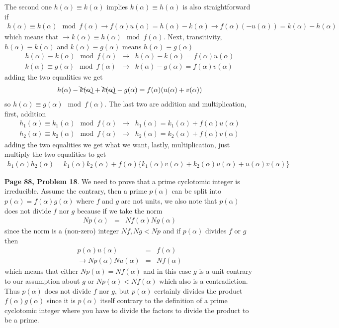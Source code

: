 \documentclass[aps,preprint,preprintnumbers,nofootinbib,showpacs,prd]{revtex4-1}
\newcommand{\nbea}{\begin{eqnarray*}}
\newcommand{\neea}{\end{eqnarray*}}
\begin{document}
The second one $h(\alpha) \equiv k(\alpha)$ implies $k(\alpha) \equiv h(\alpha)$ is also straightforward if
%
\nbea
h(\alpha) \equiv k(\alpha) \mod{f(\alpha)} \to f(\alpha)u(\alpha) = h(\alpha) - k(\alpha) \to f(\alpha)(-u(\alpha)) = k(\alpha) - h(\alpha) 
\neea
%
which means that $\to k(\alpha) \equiv h(\alpha) \mod{f(\alpha)}$. Next, transitivity, $h(\alpha) \equiv k(\alpha)$ and $k(\alpha) \equiv g(\alpha)$ means $h(\alpha) \equiv g(\alpha)$
%
\nbea
h(\alpha) \equiv k(\alpha) \mod{f(\alpha)} & \to & h(\alpha) - k(\alpha) = f(\alpha) u(\alpha) \\
k(\alpha) \equiv g(\alpha) \mod{f(\alpha)} & \to & k(\alpha) - g(\alpha) = f(\alpha) v(\alpha)
\neea
%
adding the two equalities we get
%
\nbea
h(\alpha) - \bcancel{k(\alpha)} + \bcancel{k(\alpha)} - g(\alpha) = f(\alpha) (u(\alpha)+v(\alpha))
\neea
%
so $h(\alpha) \equiv g(\alpha) \mod{f(\alpha)}$. The last two are addition and multiplication, first, addition
%
\nbea
h_1(\alpha) \equiv k_1(\alpha) \mod{f(\alpha)} & \to & h_1(\alpha) = k_1(\alpha) + f(\alpha) u(\alpha) \\
h_2(\alpha) \equiv k_2(\alpha) \mod{f(\alpha)} & \to & h_2(\alpha) = k_2(\alpha) + f(\alpha) v(\alpha)
\neea
%
adding the two equalities we get what we want, lastly, multiplication, just multiply the two equalities to get
%
\nbea
h_1(\alpha) h_2(\alpha) = k_1(\alpha)k_2(\alpha) + f(\alpha) \{ k_1(\alpha) v(\alpha) + k_2(\alpha) u(\alpha) + u(\alpha) v(\alpha)\}
\neea
%

{\bf Page 88, Problem 18}. We need to prove that a prime cyclotomic integer is irreducible. Assume the contrary, then a prime $p(\alpha)$ can be split into $p(\alpha) = f(\alpha)g(\alpha)$ where $f$ and $g$ are not units, we also note that $p(\alpha)$ does not divide $f$ nor $g$ because if we take the norm
%
\nbea
Np(\alpha) & = & Nf(\alpha) Ng(\alpha)
\neea
%
since the norm is a (non-zero) integer $Nf, Ng < Np$ and if $p(\alpha)$ divides $f$ or $g$ then
%
\nbea
p(\alpha) u(\alpha) & = & f(\alpha) \\
\to Np(\alpha) Nu(\alpha) & = & Nf(\alpha)
\neea
%
which means that either $Np(\alpha) = Nf(\alpha)$ and in this case $g$ is a unit contrary to our assumption about $g$ or $Np(\alpha) < Nf(\alpha)$ which also is a contradiction. Thus $p(\alpha)$ does not divide $f$ nor $g$, but $p(\alpha)$ certainly divides the product $f(\alpha)g(\alpha)$ since it is $p(\alpha)$ itself contrary to the definition of a prime cyclotomic integer where you have to divide the factors to divide the product to be a prime.
\end{document}
